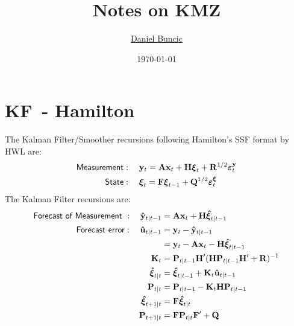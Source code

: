 \documentclass[a4paper,12pt]{article}
\begin{document}
\title{\vspace*{-20mm}Notes on KMZ}
\author{\href{http://www.danielbuncic.com}{Daniel Buncic}}
\date{\vspace*{-4mm}\textsf{\small \today}}
\maketitle

\section{KF\ - Hamilton}

The Kalman Filter/Smoother recursions following Hamilton's SSF format by HWL
are:%
\begin{align}
\mathsf{Measurement}& :\quad \mathbf{y}_{t}=\mathbf{Ax}_{t}+\mathbf{H}%
\boldsymbol{\xi }_{t}+\mathbf{R}^{1/2}\boldsymbol{\varepsilon }_{t}^{\mathbf{%
y}} \\
\mathsf{State}& :\quad \boldsymbol{\xi }_{t}=\mathbf{F}\boldsymbol{\xi }%
_{t-1}+\mathbf{Q}^{1/2}\boldsymbol{\varepsilon }_{t}^{\boldsymbol{\xi }}
\end{align}%
The Kalman Filter recursions are:%
\begin{align}
\text{\textsf{Forecast of Measurement} }:\quad \mathbf{\hat{y}}_{t|t-1}& =%
\mathbf{Ax}_{t}+\mathbf{H}\boldsymbol{\hat{\xi}}_{t|t-1}  \notag \\
\text{\textsf{Forecast error}}:\quad \mathbf{\hat{u}}_{t|t-1}& =\mathbf{y}%
_{t}-\mathbf{\hat{y}}_{t|t-1} \\
& =\mathbf{y}_{t}-\mathbf{Ax}_{t}-\mathbf{H}\boldsymbol{\hat{\xi}}_{t|t-1} 
\notag \\
\mathbf{K}_{t}& =\mathbf{P}_{t|t-1}\mathbf{H}^{\prime }(\mathbf{HP}_{t|t-1}%
\mathbf{H}^{\prime }+\mathbf{R})^{-1} \\
\boldsymbol{\hat{\xi}}_{t|t}& =\boldsymbol{\hat{\xi}}_{t|t-1}+\mathbf{K}_{t}%
\mathbf{\hat{u}}_{t|t-1} \\
\mathbf{P}_{t|t}& =\mathbf{P}_{t|t-1}-\mathbf{K}_{t}\mathbf{HP}_{t|t-1} \\
\boldsymbol{\hat{\xi}}_{t+1|t}& =\mathbf{F}\boldsymbol{\hat{\xi}}_{t|t} 
\notag \\
\mathbf{P}_{t+1|t}& =\mathbf{FP}_{t|t}\mathbf{F}^{\prime }+\mathbf{Q}  \notag
\end{align}

\bigskip

\bigskip 

\bigskip 
\end{document}
